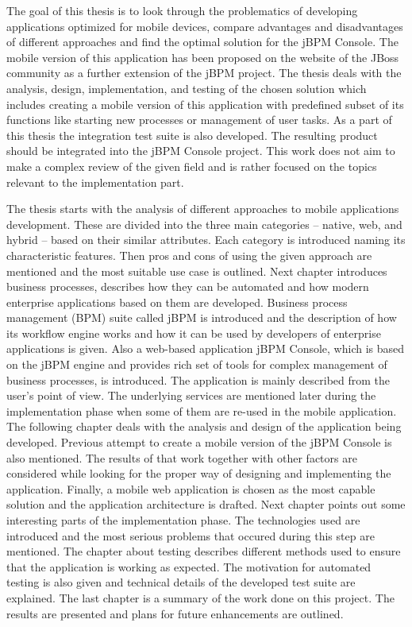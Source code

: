 \documentclass[12pt,oneside,final]{fithesis2}
\begin{document}
The goal of this thesis is to look through the problematics of developing applications optimized for mobile devices, compare advantages and disadvantages of different approaches and find the optimal solution for the jBPM Console\footnotemark{}.
The mobile version of this application has been proposed on the website of the JBoss community\footnotemark{} as a further extension of the jBPM project\footnotemark{}.
The thesis deals with the analysis, design, implementation, and testing of the chosen solution which includes creating a mobile version of this application with predefined subset of its functions like starting new processes or management of user tasks.
As a part of this thesis the integration test suite is also developed.
The resulting product should be integrated into the jBPM Console project.
This work does not aim to make a complex review of the given field and is rather focused on the topics relevant to the implementation part.

The thesis starts with the analysis of different approaches to mobile applications development.
These are divided into the three main categories -- native, web, and hybrid -- based on their similar attributes.
Each category is introduced naming its characteristic features.
Then pros and cons of using the given approach are mentioned and the most suitable use case is outlined.
Next chapter introduces business processes, describes how they can be automated and how modern enterprise applications based on them are developed.
Business process management (BPM) suite called jBPM is introduced and the description of how its workflow engine works and how it can be used by developers of enterprise applications is given.
Also a web-based application jBPM Console, which is based on the jBPM engine and provides rich set of tools for complex management of business processes, is introduced.
The application is mainly described from the user's point of view.
The underlying services are mentioned later during the implementation phase when some of them are re-used in the mobile application.
The following chapter deals with the analysis and design of the application being developed.
Previous attempt to create a mobile version of the jBPM Console is also mentioned.
The results of that work together with other factors are considered while looking for the proper way of designing and implementing the application.
Finally, a mobile web application is chosen as the most capable solution and the application architecture is drafted.
Next chapter points out some interesting parts of the implementation phase.
The technologies used are introduced and the most serious problems that occured during this step are mentioned.
The chapter about testing describes different methods used to ensure that the application is working as expected.
The motivation for automated testing is also given and technical details of the developed test suite are explained.
The last chapter is a summary of the work done on this project.
The results are presented and plans for future enhancements are outlined.
\end{document}
